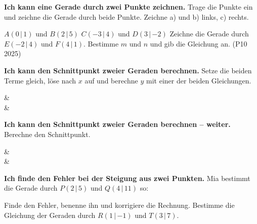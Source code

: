 \begin{aufgabe}{\textbf{Ich kann eine Gerade durch zwei Punkte zeichnen.} Trage die Punkte ein und zeichne die Gerade durch beide Punkte. Zeichne a) und b) links, c) rechts.}
\begin{teile}
\teil $A(0\,|\,1)$ und $B(2\,|\,5)$
\teil $C(-3\,|\,4)$ und $D(3\,|\,{-2})$
\teil Zeichne die Gerade durch $E(-2\,|\,4)$ und $F(4\,|\,1)$. Bestimme $m$ und $n$ und gib die Gleichung an. (P10 2025) \\   
\end{teile}

\begin{ksys}[xmin=-4,xmax=4,ymin=-3,ymax=6]
\end{ksys}\ksysabstand\begin{ksys}[xmin=-3,xmax=5,ymin=-3,ymax=6]
\end{ksys}

\end{aufgabe}

\begin{aufgabe}{\textbf{Ich kann den Schnittpunkt zweier Geraden berechnen.} Setze die beiden Terme gleich, löse nach $x$ auf und berechne $y$ mit einer der beiden Gleichungen.}
\begin{gleichungsraster}[4]
 &  \\
 &  \\
\end{gleichungsraster}
\end{aufgabe}

\begin{aufgabe}{\textbf{Ich kann den Schnittpunkt zweier Geraden berechnen – weiter.} Berechne den Schnittpunkt.}
\setcounter{teil}{4}
\begin{gleichungsraster}[4]
 &  \\
 & \\
\end{gleichungsraster}
\end{aufgabe}

\begin{aufgabe}{\textbf{Ich finde den Fehler bei der Steigung aus zwei Punkten.} Mia bestimmt die Gerade durch $P(2\,|\,5)$ und $Q(4\,|\,11)$ so:}
\begin{teile}
\teil Finde den Fehler, benenne ihn und korrigiere die Rechnung.
\teil Bestimme die Gleichung der Geraden durch $R(1\,|\,{-1})$ und $T(3\,|\,7)$.
\end{teile}
\end{aufgabe}


